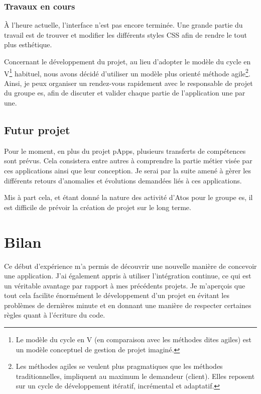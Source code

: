 \documentclass[12pt]{report}
\begin{document}
    \newpage
    
    \subsection{Travaux en cours}
    À l'heure actuelle, l'interface n'est pas encore terminée. Une grande partie du travail est de trouver et modifier les différents styles CSS afin de rendre le tout plus esthétique.
    
    Concernant le développement du projet, au lieu d'adopter le modèle du cycle en V\footnote{Le modèle du cycle en V (en comparaison avec les méthodes dites agiles) est un modèle conceptuel de gestion de projet imaginé\cite{wiki:cycleV}.} habituel, nous avons décidé d'utiliser un modèle plus orienté méthode agile\footnote{Les méthodes agiles se veulent plus pragmatiques que les méthodes traditionnelles, impliquent au maximum le demandeur (client). Elles reposent sur un cycle de développement itératif, incrémental et adaptatif\cite{wiki:agile}.}. Ainsi, je peux organiser un rendez-vous rapidement avec le responsable de projet du groupe \acrshort{es}, afin de discuter et valider chaque partie de l'application une par une.

    \section{Futur projet}
    Pour le moment, en plus du projet pApps, plusieurs transferts de compétences sont prévus. Cela consistera entre autres à comprendre la partie métier visée par ces applications ainsi que leur conception. Je serai par la suite amené à gèrer les différents retours d'anomalies et évolutions demandées liés à ces applications.
    
    Mis à part cela, et étant donné la nature des activité d'Atos pour le groupe \acrshort{es}, il est difficile de prévoir la création de projet sur le long terme.
    
    \chapter{Bilan}
    Ce début d'expérience m'a permis de découvrir une nouvelle manière de concevoir une application. J'ai également appris à utiliser l'intégration continue, ce qui est un véritable avantage par rapport à mes précédents projets. Je m'aperçois que tout cela facilite énormément le développement d'un projet en évitant les problèmes de dernières minute et en donnant une manière de respecter certaines règles quant à l'écriture du code.
    
\end{document}

